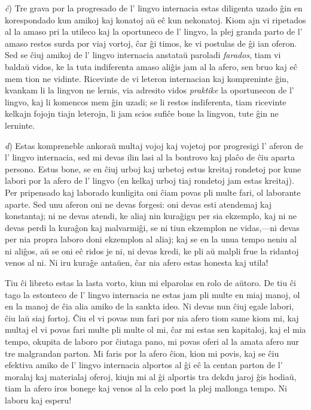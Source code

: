 \documentclass[12pt,twoside]{book}
\begin{document}
\emph{ĉ}) Tre grava por la progresado de l' lingvo internacia estas diligenta uzado ĝin en korespondado kun amikoj kaj konatoj aŭ eĉ kun nekonatoj. Kiom ajn vi ripetados al la amaso pri la utileco kaj la oportuneco de l' lingvo, la plej granda parto de l' amaso restos surda por viaj vortoj, ĉar ĝi timos, ke vi postulas de ĝi ian oferon. Sed se ĉiuj amikoj de l' lingvo internacia anstataŭ paroladi \emph{farados}, tiam vi baldaŭ vidos, ke la tuta indiferenta amaso aliĝis jam al la afero, sen bruo kaj eĉ mem tion ne vidinte. Ricevinte de vi leteron internacian kaj kompreninte ĝin, kvankam li la lingvon ne lernis, via adresito vidos \emph{praktike} la oportunecon de l' lingvo, kaj li komencos mem ĝin uzadi; se li restos indiferenta, tiam ricevinte kelkajn fojojn tiajn leterojn, li jam scios sufiĉe bone la lingvon, tute ĝin ne lerninte.

\emph{d}) Estas kompreneble ankoraŭ multaj vojoj kaj vojetoj por progresigi l' aferon de l' lingvo internacia, sed mi devas ilin lasi al la bontrovo kaj plaĉo de ĉiu aparta persono. Estus bone, se en ĉiuj urboj kaj urbetoj estus kreitaj rondetoj por kune labori por la afero de l' lingvo (en kelkaj urboj tiaj rondetoj jam estas kreitaj). Per pripensado kaj laborado kunligita oni ĉiam povas pli multe fari, ol laborante aparte. Sed unu aferon oni ne devas forgesi: oni devas esti atendemaj kaj konstantaj; ni ne devas atendi, ke aliaj nin kuraĝigu per sia ekzemplo, kaj ni ne devas perdi la kuraĝon kaj malvarmiĝi, se ni tiun ekzemplon ne vidas,—ni devas per nia propra laboro doni ekzemplon al aliaj; kaj se en la unua tempo neniu al ni aliĝos, aŭ se oni eĉ ridos je ni, ni devas kredi, ke pli aŭ malpli frue la ridantoj venos al ni. Ni iru kuraĝe antaŭen, ĉar nia afero estas honesta kaj utila!

\begin{center}
\end{center}

\newpage

Tiu ĉi libreto estas la lasta vorto, kiun mi elparolas en rolo de aŭtoro. De tiu ĉi tago la estonteco de l' lingvo internacia ne estas jam pli multe en miaj manoj, ol en la manoj de ĉia alia amiko de la sankta ideo. Ni devas nun ĉiuj egale labori, ĉiu laŭ siaj fortoj. Ĉiu el vi povas nun fari por nia afero tiom same kiom mi, kaj multaj el vi povas fari multe pli multe ol mi, ĉar mi estas sen kapitaloj, kaj el mia tempo, okupita de laboro por ĉiutaga pano, mi povas oferi al la amata afero nur tre malgrandan parton. Mi faris por la afero ĉion, kion mi povis, kaj se ĉiu efektiva amiko de l' lingvo internacia alportos al ĝi eĉ la centan parton de l' moralaj kaj materialaj oferoj, kiujn mi al ĝi alportis tra dekdu jaroj ĝis hodiaŭ, tiam la afero iros bonege kaj venos al la celo post la plej mallonga tempo. Ni laboru kaj esperu!
\end{document}
